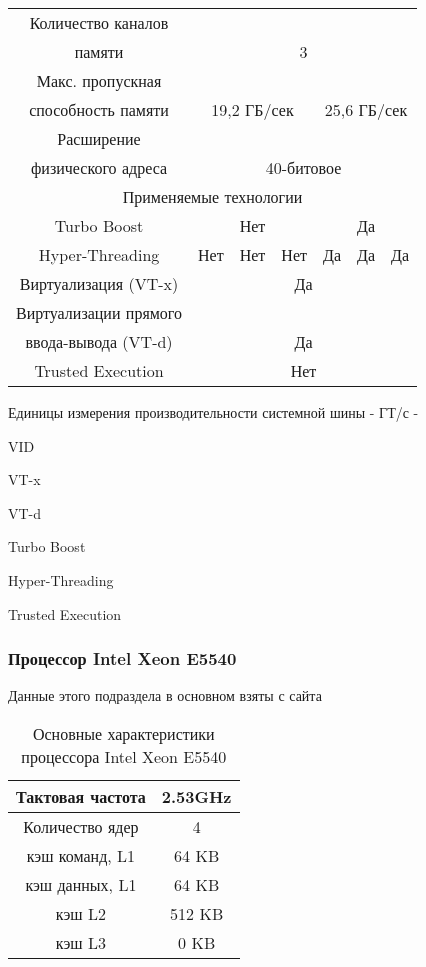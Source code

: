 \begin{center}
\begin{table}[ht]
\begin{tabular}{|c|c|c|c|c|c|c|}
		Количество каналов & \multicolumn{6}{c|}{} \\
		памяти & \multicolumn{6}{c|}{3} \\ \hline
		Макс. пропускная & \multicolumn{6}{c|}{} \\ \hline
		способность памяти & \multicolumn{3}{c|}{19,2 ГБ/сек} & \multicolumn{3}{c|}{25,6 ГБ/сек }\\ \hline
		Расширение         & \multicolumn{6}{c|}{} \\ 
		физического адреса & \multicolumn{6}{c|}{40-битовое} \\ \hline
		\multicolumn{7}{|c|}{Применяемые технологии} \\ \hline
		Turbo Boost & \multicolumn{3}{c|}{Нет} & \multicolumn{3}{c|}{Да} \\ \hline
		Hyper-Threading & Нет & Нет & Нет & Да & Да & Да \\ \hline
		Виртуализация (VT-x) & \multicolumn{6}{c|}{Да} \\ \hline
		Виртуализации прямого & \multicolumn{6}{c|}{} \\
		ввода-вывода (VT-d)   & \multicolumn{6}{c|}{ Да} \\ \hline
		Trusted Execution &   \multicolumn{6}{c|}{ Нет} \\ \hline
	\end{tabular}
\end{table}
\end{center}

Единицы измерения производительности системной шины - ГТ/с -

VID

VT-x

VT-d

Turbo Boost

Hyper-Threading

Trusted Execution



\subsubsection{Процессор Intel Xeon  E5540}
Данные этого подраздела в основном взяты с сайта \cite{geek_E5540}


\begin{table}[ht]
\begin{center}
\caption{Основные характеристики процессора Intel Xeon  E5540}
\begin{tabular}{|c|c|}
\hline	
Тактовая частота & 2.53GHz   \\ \hline
Количество ядер & 4 	     \\ \hline
кэш команд, L1 &  64 KB      \\ \hline
кэш данных, L1 &  64 KB       \\ \hline
кэш L2         &  512 KB      \\ \hline
кэш L3         &  0 KB        \\ \hline
\end{tabular}
\end{center} 	
\end{table} 	

